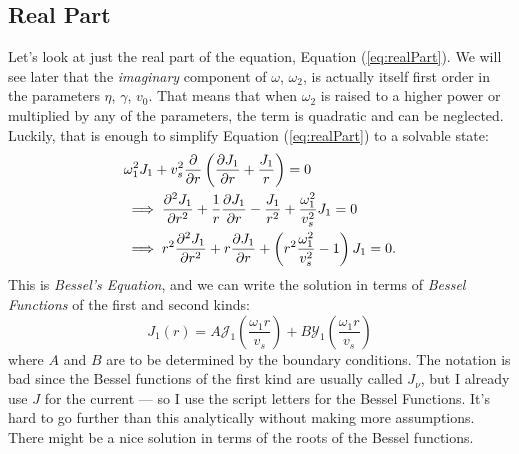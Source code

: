 \documentclass[12pt]{article}
\begin{document}
	\subsection{Real Part}
	Let's look at just the real part of the equation, Equation (\ref{eq:realPart}). We will see later that the \textit{imaginary} component of $\omega$, $\omega_2$, is actually itself first order in the parameters $\eta$, $\gamma$, $v_0$.  That means that when $\omega_2$ is raised to a higher power or multiplied by any of the parameters, the term is quadratic and can be neglected.  Luckily, that is enough to simplify Equation (\ref{eq:realPart}) to a solvable state:
	\begin{align}
	&\omega_1^2J_1 + v_s^2\pdv{r}\left(\pdv{J_1}{r} + \frac{J_1}{r}\right) = 0 \nonumber \\
	&\implies \pdv[2]{J_1}{r} + \frac{1}{r}\pdv{J_1}{r} - \frac{J_1}{r^2} + \frac{\omega_1^2}{v_s^2}J_1 = 0 \nonumber \\
	&\implies r^2\pdv[2]{J_1}{r} + r\pdv{J_1}{r} + \left(r^2\frac{\omega_1^2}{v_s^2} - 1 \right)J_1 = 0.
 	\end{align}
 	This is \textit{Bessel's Equation}, and we can write the solution in terms of \textit{Bessel Functions} of the first and second kinds:
 	\begin{equation}
 	J_1(r) = A \mathcal{J}_1\left(\frac{\omega_1r}{v_s}\right) + B \mathcal{Y}_1\left(\frac{\omega_1r}{v_s}\right)
 	\end{equation}
 	where $A$ and $B$ are to be determined by the boundary conditions.  The notation is bad since the Bessel functions of the first kind are usually called $J_\nu$, but I already use $J$ for the current --- so I use the script letters for the Bessel Functions.  It's hard to go further than this analytically without making more assumptions.  There might be a nice solution in terms of the roots of the Bessel functions.
 	
\end{document}
